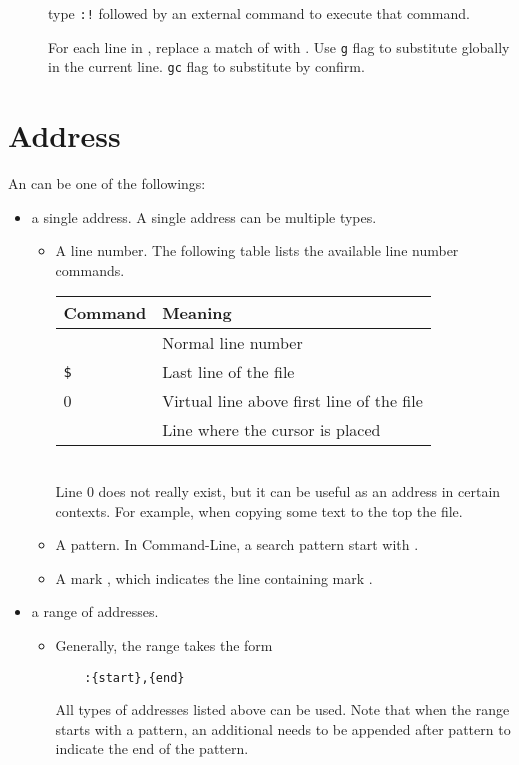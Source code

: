 \begin{description}
  \item[\syntax{:!}] type \texttt{:!} followed by an external command to execute that command.
  \item[] For each line in \syntax{[range]}, replace a match of  with .
Use \verb|g| flag to substitute globally in the current line. \verb|gc| flag to substitute by confirm.
\end{description}

\section{Address}
An  can be one of the followings:
\begin{itemize}
  \item a single address. A single address can be multiple types.
    \begin{itemize}
      \item A line number. The following table lists the available line number commands.\\
	\begin{tabular}[hbtp]{ll}
	  \hline
	  Command&Meaning\\
	  \hline
	  \syntax{<number>}&Normal line number\\
	  \verb|$|&Last line of the file\\
	  0&Virtual line above first line of the file\\
	  \syntax{.}&Line where the cursor is placed\\
	  \hline
	\end{tabular}\\
	Line 0 does not really exist, but it can be useful as an address in certain contexts. For example, when copying some text to the top the file.
      \item A pattern. In Command-Line, a search pattern start with \syntax{/}.
      \item A mark , which indicates the line containing mark .
    \end{itemize}
  \item a range of addresses.
    \begin{itemize}
      \item Generally, the range takes the form
	\begin{lstlisting}
	:{start},{end}
	\end{lstlisting}
	All types of addresses listed above can be used. Note that when the range starts with a pattern, an additional \syntax{/} needs to be appended after pattern to indicate the end of the pattern.

\end{itemize}
\end{itemize}
